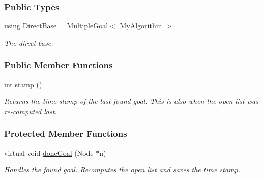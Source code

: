 \subsubsection*{Public Types}
\begin{DoxyCompactItemize}
\item 
using \hyperlink{structslb_1_1ext_1_1policy_1_1goalHandler_1_1MaxHeuristic_ad4d04afe71170bb799d38e7d35ecb66f}{Direct\+Base} = \hyperlink{structslb_1_1ext_1_1policy_1_1goalHandler_1_1MultipleGoal}{Multiple\+Goal}$<$ My\+Algorithm $>$\hypertarget{structslb_1_1ext_1_1policy_1_1goalHandler_1_1MaxHeuristic_ad4d04afe71170bb799d38e7d35ecb66f}{}\label{structslb_1_1ext_1_1policy_1_1goalHandler_1_1MaxHeuristic_ad4d04afe71170bb799d38e7d35ecb66f}

\begin{DoxyCompactList}\small\item\em The direct base. \end{DoxyCompactList}\end{DoxyCompactItemize}
\subsubsection*{Public Member Functions}
\begin{DoxyCompactItemize}
\item 
int \hyperlink{structslb_1_1ext_1_1policy_1_1goalHandler_1_1MaxHeuristic_a9fa9986f7676f62b950a66b5f31e2322}{stamp} ()
\begin{DoxyCompactList}\small\item\em Returns the time stamp of the last found goal. This is also when the open list was re-\/computed last. \end{DoxyCompactList}\end{DoxyCompactItemize}
\subsubsection*{Protected Member Functions}
\begin{DoxyCompactItemize}
\item 
virtual void \hyperlink{structslb_1_1ext_1_1policy_1_1goalHandler_1_1MaxHeuristic_aec76c8c57f24948fe158869d9f715418}{done\+Goal} (Node $\ast$n)
\begin{DoxyCompactList}\small\item\em Handles the found goal. Recomputes the open list and saves the time stamp. \end{DoxyCompactList}\end{DoxyCompactItemize}
